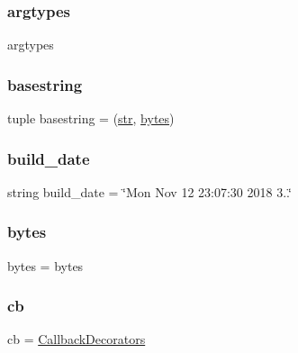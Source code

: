 \subsubsection{\texorpdfstring{argtypes}{argtypes}}
{\footnotesize\ttfamily argtypes}

\mbox{\label{namespacevlc_a8a82bca121a0ad060450443ae990517d}} 
\subsubsection{\texorpdfstring{basestring}{basestring}}
{\footnotesize\ttfamily tuple basestring = (\hyperlink{namespacevlc_a4b99ff73a8a869319570237b5c57ab03}{str}, \hyperlink{namespacevlc_ab5b288623cd78ddf5eeabe825d17a1c1}{bytes})}

\mbox{\label{namespacevlc_a9d9b637ad5b2c71a1a6464d5321dd702}} 
\subsubsection{\texorpdfstring{build\+\_\+date}{build\_date}}
{\footnotesize\ttfamily string build\+\_\+date = \char`\"{}Mon Nov 12 23\+:07\+:30 2018 3..\char`\"{}}

\mbox{\label{namespacevlc_ab5b288623cd78ddf5eeabe825d17a1c1}} 
\subsubsection{\texorpdfstring{bytes}{bytes}}
{\footnotesize\ttfamily bytes = bytes}

\mbox{\label{namespacevlc_a48994b0a618061e8aa4b2d314712d3da}} 
\subsubsection{\texorpdfstring{cb}{cb}}
{\footnotesize\ttfamily cb = \hyperlink{classvlc_1_1_callback_decorators}{Callback\+Decorators}}

\mbox{\label{namespacevlc_afe27f0e1c4864c0be1ff0061994415f2}} 
